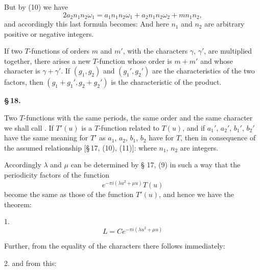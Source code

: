 But by (10) we have
\[
2a_2n_1n_2\omega_1 = a_1n_1n_2\omega_1 + a_2n_1n_2\omega_2 + mn_1n_2,
\]
and accordingly this last formula becomes:
And here $n_1$ and $n_2$ are arbitrary positive or negative integers.

If two $T$-functions of orders $m$ and $m'$, with the characters $\gamma$, $\gamma'$, are multiplied together, there arises a new $T$-function whose order is $m+m'$ and whose character is $\gamma+\gamma'$. If $(g_1, g_2)$ and $(g_1', g_2')$ are the characteristics of the two factors, then $(g_1+g_1', g_2+g_2')$ is the characteristic of the product.

\begin{center}
\textbf{\S\,18. }
\end{center}

Two $T$-functions with the same periods, the same order and the same character we shall call . If $T'(u)$ is a $T$-function related to $T(u)$, and if $a_1'$, $a_2'$, $b_1'$, $b_2'$ have the same meaning for $T'$ as $a_1$, $a_2$, $b_1$, $b_2$ have for $T$, then in consequence of the assumed relationship [§\,17, (10), (11)]:
where $n_1$, $n_2$ are integers.

Accordingly $\lambda$ and $\mu$ can be determined by § 17, (9) in such a way that the periodicity factors of the function
\[
e^{-\pi i(\lambda u^2+\mu u)}T(u)
\]
become the same as those of the function $T'(u)$, and hence we have the theorem:

1. 
\[
L = Ce^{-\pi i(\lambda u^2+\mu u)}
\]

Further, from the equality of the characters there follows immediately:

2.  and from this:
